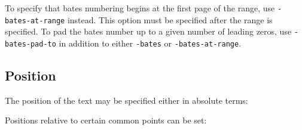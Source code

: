 \documentclass{book}
\begin{document}
To specify that bates numbering begins at the first page of the range, use \texttt{-bates-at-range} instead. This option must be specified after the range is specified. To pad the bates number up to a given number of leading zeros, use \texttt{-bates-pad-to} in addition to either \texttt{-bates} or \texttt{-bates-at-range}.

  \subsection{Position}
  \label{position}
  The position of the text may be specified either in absolute terms:

\noindent{}

  \noindent Positions relative to certain common points can be set:
\end{document}
